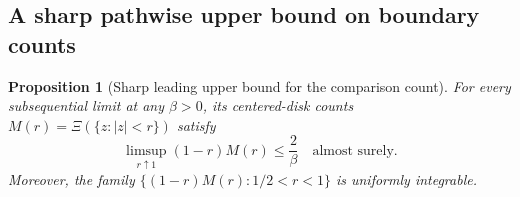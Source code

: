 \documentclass[11pt,a4paper]{article}
\numberwithin{equation}{section}
\newtheorem{proposition}[theorem]{Proposition}
\theoremstyle{definition}
\theoremstyle{remark}
\begin{document}
\subsection{A sharp pathwise upper bound on boundary counts}

\begin{proposition}[Sharp leading upper bound for the comparison count]
\label{prop:radial-comparison-sharp-count}
For every subsequential limit at any $\beta>0$, its centered-disk
counts $M(r)=\Xi(\{z:|z|<r\})$ satisfy
\begin{equation}
 \limsup_{r\uparrow1}(1-r)M(r)\le\frac2\beta
 \quad\text{almost surely}.
 \label{eq:radial-comparison-sharp-count}
\end{equation}
Moreover, the family $\{(1-r)M(r):1/2<r<1\}$ is uniformly
integrable.
\end{proposition}
\end{document}
